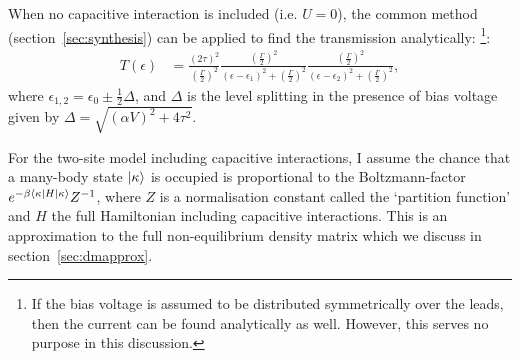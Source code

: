 \clearpage
When no capacitive interaction is included (i.e. $U=0$), the common method (section~\ref{sec:synthesis}) can be applied to find the transmission analytically: \cite{perrinnano}\footnote{If the bias voltage is assumed to be distributed symmetrically over the leads, then the current can be found analytically as well. However, this serves no purpose in this discussion.}:
\begin{align*}
T(\epsilon) &= \frac{ (2\tau)^2 }{(\frac{\Gamma}{2})^2} \frac{(\frac{\Gamma}{2})^2}{(\epsilon-\epsilon_1)^2 + (\frac{\Gamma}{2})^2}\frac{(\frac{\Gamma}{2})^2}{(\epsilon-\epsilon_2)^2 + (\frac{\Gamma}{2})^2},
\end{align*}
where $\epsilon_{1,2} = \epsilon_0 \pm \frac{1}{2} \Delta$, and $\Delta$ is the level splitting in the presence of bias voltage given by $\Delta = \sqrt{ (\alpha V)^2+ 4\tau^2}$. 

For the two-site model including capacitive interactions, I assume the chance that a many-body state $\ket{\kappa}$ is occupied is proportional to the Boltzmann-factor $e^{ -\beta \braket{ \kappa\left| H \right| \kappa}} Z^{-1}$, where $Z$ is a normalisation constant called the `partition function' and $H$ the full Hamiltonian including capacitive interactions. This is an approximation to the full non-equilibrium density matrix which we discuss in section~\ref{sec:dmapprox}.

